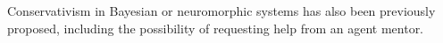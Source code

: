 Conservativism in Bayesian \cite{pmlr-v125-cohen20a} or neuromorphic systems \cite{byrnes_steve_conservatism_2020} has also been previously proposed, including the possibility of requesting help from an agent mentor.










